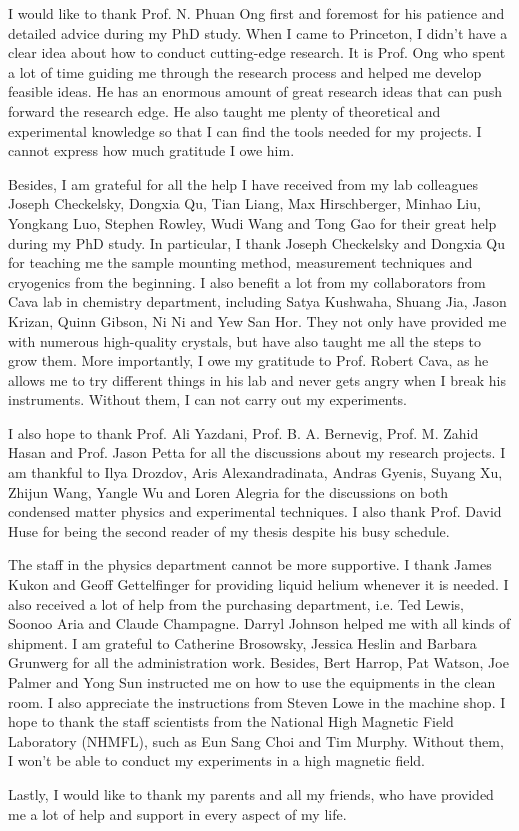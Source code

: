 I would like to thank Prof. N. Phuan Ong first and foremost for his patience and detailed advice during my PhD study. When I came to Princeton, I didn't have a clear idea about how to conduct cutting-edge research. It is Prof. Ong who spent a lot of time guiding me through the research process and helped me develop feasible ideas. He has an enormous amount of great research ideas that can push forward the research edge. He also taught me plenty of theoretical and experimental knowledge so that I can find the tools needed for my projects. I cannot express how much gratitude I owe him.

Besides, I am grateful for all the help I have received from my lab colleagues Joseph Checkelsky, Dongxia Qu, Tian Liang, Max Hirschberger, Minhao Liu, Yongkang Luo, Stephen Rowley, Wudi Wang and Tong Gao for their great help during my PhD study. In particular, I thank Joseph Checkelsky and Dongxia Qu for teaching me the sample mounting method, measurement techniques and cryogenics from the beginning. I also benefit a lot from my collaborators from Cava lab in chemistry department, including Satya Kushwaha, Shuang Jia, Jason Krizan, Quinn Gibson, Ni Ni and Yew San Hor. They not only have provided me with numerous high-quality crystals, but have also taught me all the steps to grow them. More importantly, I owe my gratitude to Prof. Robert Cava, as he allows me to try different things in his lab and never gets angry when I break his instruments. Without them, I can not carry out my experiments.

I also hope to thank Prof. Ali Yazdani, Prof. B. A. Bernevig, Prof. M. Zahid Hasan and Prof. Jason Petta for all the discussions about my research projects. I am thankful to Ilya Drozdov, Aris Alexandradinata, Andras Gyenis, Suyang Xu, Zhijun Wang, Yangle Wu and Loren Alegria for the discussions on both condensed matter physics and experimental techniques. I also thank Prof. David Huse for being the second reader of my thesis despite his busy schedule. 

The staff in the physics department cannot be more supportive. I thank James Kukon and Geoff Gettelfinger for providing liquid helium whenever it is needed. I also received a lot of help from the purchasing department, i.e. Ted Lewis, Soonoo Aria and Claude Champagne. Darryl Johnson helped me with all kinds of shipment. I am grateful to Catherine Brosowsky, Jessica Heslin and Barbara Grunwerg for all the administration work. Besides,  Bert Harrop, Pat Watson, Joe Palmer and Yong Sun instructed me on how to use the equipments in the clean room. I also appreciate the instructions from Steven Lowe in the machine shop. I hope to thank the staff scientists from the National High Magnetic Field Laboratory (NHMFL), such as Eun Sang Choi and Tim Murphy. Without them, I won't be able to conduct my experiments in a high magnetic field.

Lastly, I would like to thank my parents and all my friends, who have provided me a lot of help and support in every aspect of my life. 
